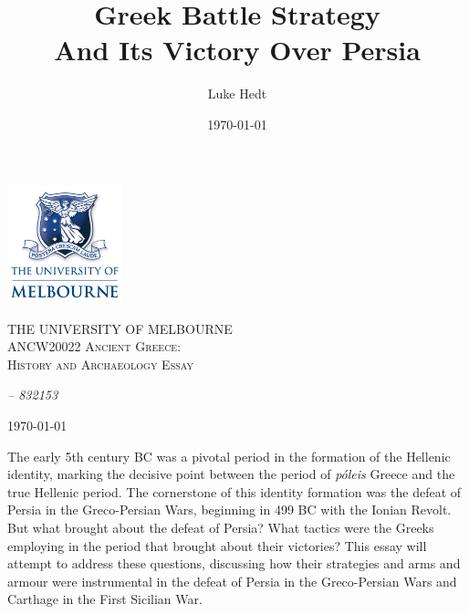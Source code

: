 \documentclass[twoside, a4paper, 12pt]{article}
\title{Greek Battle Strategy \\ And Its Victory Over Persia}
\author{Luke Hedt}
\date{\today}
\begin{document}
\begin{titlepage}
    \centering
    \includegraphics[width=0.25\textwidth]{UniLogo.png}\par\vspace{1cm}
    {\scshape\Large THE UNIVERSITY OF MELBOURNE \\
              \large ANCW20022 Ancient Greece: \\
              History and Archaeology Essay\par}
    \vspace{1.5cm}
    {\Huge \thetitle \par}
    \vfill

    {\Large\itshape \theauthor \hspace{1em} -- \hspace{1em} 832153 \par}
    \vspace{1.5cm}
    {\Large \today}
\end{titlepage}
\pagestyle{plain}

The early 5th century BC was a pivotal period in the formation of the Hellenic
identity, marking the decisive point between the period of \emph{p{\'o}leis} Greece
and the true Hellenic period. The cornerstone of this identity formation
was the defeat of Persia in the Greco-Persian Wars, beginning in 499 BC
with the Ionian Revolt. But what brought about the defeat of Persia? What tactics
were the Greeks employing in the period that brought about their victories?
This essay will attempt to address these questions, discussing how their
strategies and arms and armour were instrumental in the defeat of Persia
in the Greco-Persian Wars and
Carthage in the First Sicilian War.

\par\vspace{1em}
\end{document}
